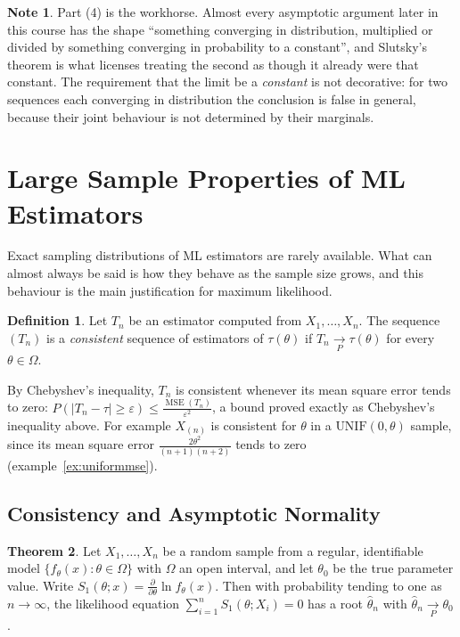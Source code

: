 \documentclass[12pt,a4paper]{report}
\theoremstyle{definition}
\newtheorem{thm}{Theorem}[section]
\newtheorem{defn}[thm]{Definition}
\newtheorem*{note}{Note}
\DeclareMathOperator{\MSE}{MSE}
\begin{document}
\begin{note}
Part (4) is the workhorse. Almost every asymptotic argument later in this course
has the shape ``something converging in distribution, multiplied or divided by
something converging in probability to a constant'', and Slutsky's theorem is
what licenses treating the second as though it already were that constant. The
requirement that the limit be a \emph{constant} is not decorative: for two
sequences each converging in distribution the conclusion is false in general,
because their joint behaviour is not determined by their marginals.
\end{note}

\section{Large Sample Properties of ML Estimators}
\label{sec:largesample}

Exact sampling distributions of ML estimators are rarely available. What can
almost always be said is how they behave as the sample size grows, and this
behaviour is the main justification for maximum likelihood.

\begin{defn}
\label{def:consistent}
Let $T_n$ be an estimator computed from $X_1, \dots, X_n$. The sequence $(T_n)$ is a
\emph{consistent} sequence of estimators of $\tau(\theta)$ if
$T_n\underset{P}{\longrightarrow}\tau(\theta)$ for every $\theta\in\Omega$.
\end{defn}

By Chebyshev's inequality, $T_n$ is consistent whenever its mean square error
tends to zero: $P(|T_n - \tau|\ge\varepsilon)\le\frac{\MSE(T_n)}{\varepsilon^2}$, a
bound proved exactly as Chebyshev's inequality above. For example
$X_{(n)}$ is consistent for $\theta$ in a $\text{UNIF}(0, \theta)$ sample, since its mean
square error $\frac{2\theta^2}{(n + 1)(n + 2)}$ tends to zero
(example~\ref{ex:uniformmse}).

\subsection{Consistency and Asymptotic Normality}

\begin{thm}
\label{thm:mleconsistent}
Let $X_1, \dots, X_n$ be a random sample from a regular, identifiable model
$\{f_\theta(x) : \theta\in\Omega\}$ with $\Omega$ an open interval, and let $\theta_0$ be
the true parameter value. Write $S_1(\theta; x) = \frac{\partial}{\partial\theta}\ln f_\theta(x)$.
Then with probability tending to one as $n\to\infty$, the likelihood equation
$\sum_{i=1}^n S_1(\theta; X_i) = 0$ has a root $\hat\theta_n$ with
$\hat\theta_n\underset{P}{\longrightarrow}\theta_0$.
\end{thm}
\end{document}
